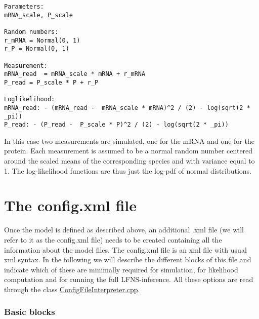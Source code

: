 \documentclass[11pt]{article} %
\begin{document}
\begin{tcolorbox}
\begin{verbatim}
Parameters:
mRNA_scale, P_scale

Random numbers:
r_mRNA = Normal(0, 1)
r_P = Normal(0, 1)

Measurement:
mRNA_read  = mRNA_scale * mRNA + r_mRNA
P_read = P_scale * P + r_P

Loglikelihood:
mRNA_read: - (mRNA_read -  mRNA_scale * mRNA)^2 / (2) - log(sqrt(2 * _pi))
P_read: - (P_read -  P_scale * P)^2 / (2) - log(sqrt(2 * _pi))
\end{verbatim}
\end{tcolorbox}


In this case two measurements are simulated, one for the mRNA and one for the protein. Each measurement is assumed to be a normal random number centered around the scaled means of the corresponding species and with variance equal to 1. The log-likelihood functions are thus just the log-pdf of normal distributions.

\part{The config.xml file}
Once the model is defined as described above, an additional  .xml file (we will refer to it as the config.xml file) needs to be created containing all the information about the model files. The config.xml file is an xml file with usual xml syntax. In the following we will describe the different blocks of this file and indicate which of these are minimally required for simulation, for likelihood computation and for running the full LFNS-inference. All these options are read through the class \href{https://github.com/Mijan/LFNS/blob/publishable/src/io/ConfigFileInterpreter.cpp}{ConfigFileInterpreter.cpp}.

\section{Basic blocks}
\end{document}
